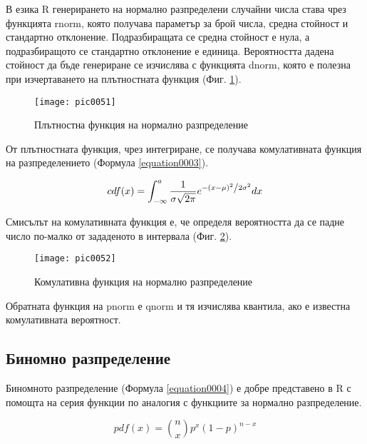 В езика R генерирането на нормално разпределени случайни числа става чрез функцията rnorm, която получава параметър за брой числа, средна стойност и стандартно отклонение. Подразбиращата се средна стойност е нула, а подразбиращото се стандартно отклонение е единица. Вероятността дадена стойност да бъде генериране се изчислява с функцията dnorm, която е полезна при изчертаването на плътностната функция (Фиг. \ref{figure0051}).

\begin{figure}[h!]
  \centering
  \texttt{[image: pic0051]}
  \caption{Плътностна функция на нормално разпределение}
\label{figure0051}
\end{figure}
\FloatBarrier

От плътностната функция, чрез интегриране, се получава комулативната функция на разпределението (Формула \ref{equation0003}).

\begin{equation}
cdf(x) = \int_{-\infty}^{a} \frac{1}{{\sigma \sqrt {2\pi } }}e^{{{ - \left( {x - \mu } \right)^2 } \mathord{\left/ {\vphantom {{ - \left( {x - \mu } \right)^2 } {2\sigma ^2 }}} \right. \kern-\nulldelimiterspace} {2\sigma ^2 }}} dx
\label{equation0003}
\end{equation}

Смисълът на комулативната функция е, че определя вероятността да се падне число по-малко от зададеното в интервала (Фиг. \ref{figure0052}).

\begin{figure}[h!]
  \centering
  \texttt{[image: pic0052]}
  \caption{Комулативна функция на нормално разпределение}
\label{figure0052}
\end{figure}
\FloatBarrier

Обратната функция на pnorm е qnorm и тя изчислява квантила, ако е известна комулативната вероятност.

\subsection{Биномно разпределение}

Биномното разпределение (Формула \ref{equation0004}) е добре представено в R с помощта на серия функции по аналогия с функциите за нормално разпределение. 

\begin{equation}
pdf(x) = \binom{n}{x}p^{x}(1-p)^{n-x}
\label{equation0004}
\end{equation}

